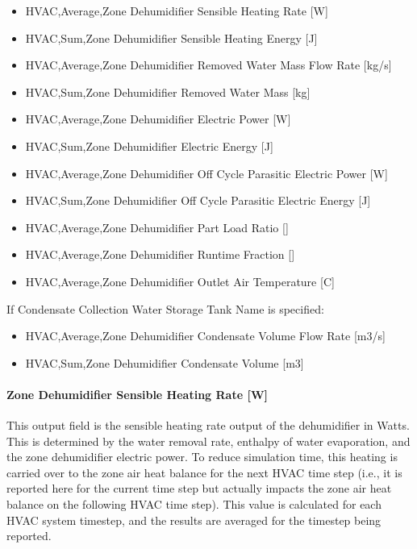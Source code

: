 \begin{itemize}
\item
  HVAC,Average,Zone Dehumidifier Sensible Heating Rate {[}W{]}
\item
  HVAC,Sum,Zone Dehumidifier Sensible Heating Energy {[}J{]}
\item
  HVAC,Average,Zone Dehumidifier Removed Water Mass Flow Rate {[}kg/s{]}
\item
  HVAC,Sum,Zone Dehumidifier Removed Water Mass {[}kg{]}
\item
  HVAC,Average,Zone Dehumidifier Electric Power {[}W{]}
\item
  HVAC,Sum,Zone Dehumidifier Electric Energy {[}J{]}
\item
  HVAC,Average,Zone Dehumidifier Off Cycle Parasitic Electric Power {[}W{]}
\item
  HVAC,Sum,Zone Dehumidifier Off Cycle Parasitic Electric Energy {[}J{]}
\item
  HVAC,Average,Zone Dehumidifier Part Load Ratio {[]}
\item
  HVAC,Average,Zone Dehumidifier Runtime Fraction {[]}
\item
  HVAC,Average,Zone Dehumidifier Outlet Air Temperature {[}C{]}
\end{itemize}

If Condensate Collection Water Storage Tank Name is specified:

\begin{itemize}
\item
  HVAC,Average,Zone Dehumidifier Condensate Volume Flow Rate {[}m3/s{]}
\item
  HVAC,Sum,Zone Dehumidifier Condensate Volume {[}m3{]}
\end{itemize}

\paragraph{Zone Dehumidifier Sensible Heating Rate {[}W{]}}\label{zone-dehumidifier-sensible-heating-rate-w}

This output field is the sensible heating rate output of the dehumidifier in Watts. This is determined by the water removal rate, enthalpy of water evaporation, and the zone dehumidifier electric power. To reduce simulation time, this heating is carried over to the zone air heat balance for the next HVAC time step (i.e., it is reported here for the current time step but actually impacts the zone air heat balance on the following HVAC time step). This value is calculated for each HVAC system timestep, and the results are averaged for the timestep being reported.

